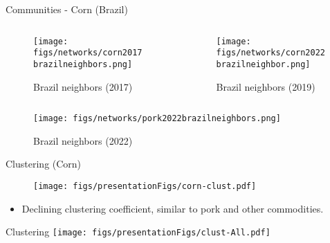 \documentclass[10pt,xcolor={dvipsnames}]{beamer}
\begin{document}
\begin{frame}{Communities - Corn (Brazil)}
\begin{columns}[onlytextwidth]
    \begin{column}{.5\textwidth}
        \begin{minipage}[t][.5\textheight][t]{\textwidth}
            \begin{figure}
                \caption*{\tiny Brazil neighbors (2017)}
                \texttt{[image: figs/networks/corn2017brazilneighbors.png]}
            \end{figure}
        \end{minipage}
    \end{column}
\hfill
    \begin{column}{.5\textwidth}
        \begin{minipage}[t][.5\textheight][t]{\textwidth}
            \begin{figure}
                \caption*{\tiny Brazil neighbors (2019)}
                \texttt{[image: figs/networks/corn2022brazilneighbor.png]}\\
            \end{figure}
        \end{minipage}
    \end{column}
\end{columns}
\vspace{-35pt}
\begin{figure}
    \centering
    \caption*{\tiny Brazil neighbors (2022)}
    \texttt{[image: figs/networks/pork2022brazilneighbors.png]}    
\end{figure}

\end{frame}
\fi

\begin{frame}{Clustering (Corn)}
\begin{figure}
    \centering
    \texttt{[image: figs/presentationFigs/corn-clust.pdf]}
\end{figure}
\begin{itemize}
    \small
    \item[\ding{213}] Declining clustering coefficient, similar to pork and other commodities.  \\
    
\end{itemize}
\end{frame}
\begin{frame}{Clustering}
    \texttt{[image: figs/presentationFigs/clust-All.pdf]}
\end{frame}
\end{document}

